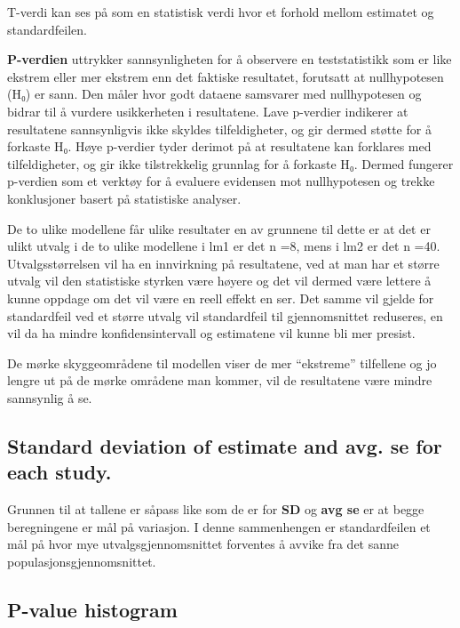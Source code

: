 \documentclass[
  letterpaper,
  DIV=11,
  numbers=noendperiod]{scrreprt}
\begin{document}
T-verdi kan ses på som en statistisk verdi hvor et forhold mellom
estimatet og standardfeilen.

\textbf{P-verdien} uttrykker sannsynligheten for å observere en
teststatistikk som er like ekstrem eller mer ekstrem enn det faktiske
resultatet, forutsatt at nullhypotesen (H₀) er sann. Den måler hvor godt
dataene samsvarer med nullhypotesen og bidrar til å vurdere usikkerheten
i resultatene. Lave p-verdier indikerer at resultatene sannsynligvis
ikke skyldes tilfeldigheter, og gir dermed støtte for å forkaste H₀.
Høye p-verdier tyder derimot på at resultatene kan forklares med
tilfeldigheter, og gir ikke tilstrekkelig grunnlag for å forkaste H₀.
Dermed fungerer p-verdien som et verktøy for å evaluere evidensen mot
nullhypotesen og trekke konklusjoner basert på statistiske analyser.

De to ulike modellene får ulike resultater en av grunnene til dette er
at det er ulikt utvalg i de to ulike modellene i lm1 er det n =8, mens i
lm2 er det n =40. Utvalgsstørrelsen vil ha en innvirkning på
resultatene, ved at man har et større utvalg vil den statistiske styrken
være høyere og det vil dermed være lettere å kunne oppdage om det vil
være en reell effekt en ser. Det samme vil gjelde for standardfeil ved
et større utvalg vil standardfeil til gjennomsnittet reduseres, en vil
da ha mindre konfidensintervall og estimatene vil kunne bli mer presist.

De mørke skyggeområdene til modellen viser de mer ``ekstreme''
tilfellene og jo lengre ut på de mørke områdene man kommer, vil de
resultatene være mindre sannsynlig å se.

\subsection{\texorpdfstring{Standard deviation of \textbf{estimate} and
avg. \textbf{se} for each
study.}{Standard deviation of estimate and avg. se for each study.}}\label{standard-deviation-of-estimate-and-avg.-se-for-each-study.}

Grunnen til at tallene er såpass like som de er for \textbf{SD} og
\textbf{avg se} er at begge beregningene er mål på variasjon. I denne
sammenhengen er standardfeilen et mål på hvor mye utvalgsgjennomsnittet
forventes å avvike fra det sanne populasjonsgjennomsnittet.

\subsection{P-value histogram}\label{p-value-histogram}
\end{document}
